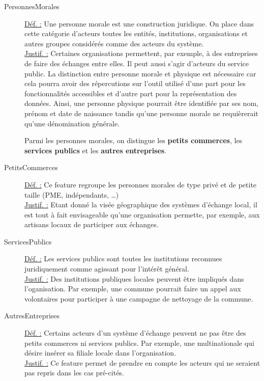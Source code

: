 \begin{description}
\item [PersonnesMorales]
\underline{Déf. :}  Une personne morale est une construction juridique.  On place dans cette catégorie d'acteurs toutes les entités,  institutions,  organisations et autres groupes considérés comme des acteurs du système.  
\\ \underline{Justif. :}  Certaines organisations permettent,  par exemple,  à des entreprises de faire des échanges entre elles.  Il peut aussi s'agir d'acteurs du service public.  La distinction entre personne morale et physique est nécessaire car cela pourra avoir des répercutions sur l'outil utilisé d'une part pour les fonctionnalités accessibles et d'autre part pour la représentation des données.  Ainsi,  une personne physique pourrait être identifiée par ses nom,  prénom et date de naissance tandis qu'une personne morale ne requièrerait qu'une dénomination générale. 
\newline

Parmi les personnes morales,  on distingue les \textbf{petits commerces},  les \textbf{services publics} et les \textbf{autres entreprises}.

\item [PetitsCommerces]
\underline{Déf. :}  Ce feature regroupe les personnes morales de type privé et de petite taille (PME,  indépendants,  \dots )
\\ \underline{Justif. :}  Etant donné la visée géographique des systèmes d'échange local,  il est tout à fait envisageable qu'une organisation permette,  par exemple,  aux artisans locaux de participer aux échanges.  
\newline

\item [ServicesPublics]
\underline{Déf. :}  Les services publics sont toutes les institutions reconnues juridiquement comme agissant pour l'intérêt général.
\\ \underline{Justif. :}  Des institutions publiques locales peuvent être impliqués dans l'oganisation.  Par exemple,  une commune pourrait faire un appel aux volontaires pour participer à une campagne de nettoyage de la commune.  
\newline

\item [AutresEntreprises]
\underline{Déf. :}  Certains acteurs d'un système d'échange peuvent ne pas être des petits commerces ni services publics.  Par exemple,  une multinationale qui désire insérer sa filiale locale dans l'organisation.
\\ \underline{Justif. :}  Ce feature permet de prendre en compte les acteurs qui ne seraient pas repris dans les cas pré-cités.  
\newline


\end{description}
